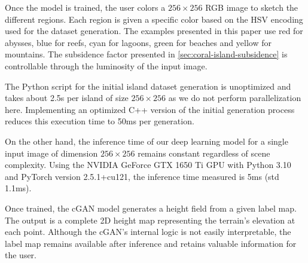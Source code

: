 Once the model is trained, the user colors a $256\times256$ RGB image to sketch the different regions. Each region is given a specific color based on the HSV encoding used for the dataset generation. The examples presented in this paper use red for abysses, blue for reefs, cyan for lagoons, green for beaches and yellow for mountains. The subsidence factor presented in \cref{sec:coral-island-subsidence} is controllable through the luminosity of the input image. 


The Python script for the initial island dataset generation is unoptimized and takes about 2.5s per island of size $256 \times 256$ as we do not perform parallelization here. Implementing an optimized C++ version of the initial generation process reduces this execution time to 50ms per generation.

On the other hand, the inference time of our deep learning model for a single input image of dimension $256 \times 256$ remains constant regardless of scene complexity. Using the NVIDIA GeForce GTX 1650 Ti GPU with Python 3.10 and PyTorch version 2.5.1+cu121, the inference time measured is 5ms (std 1.1ms). 


Once trained, the cGAN model generates a height field from a given label map. The output is a complete 2D height map representing the terrain's elevation at each point. Although the cGAN's internal logic is not easily interpretable, the label map remains available after inference and retains valuable information for the user.



